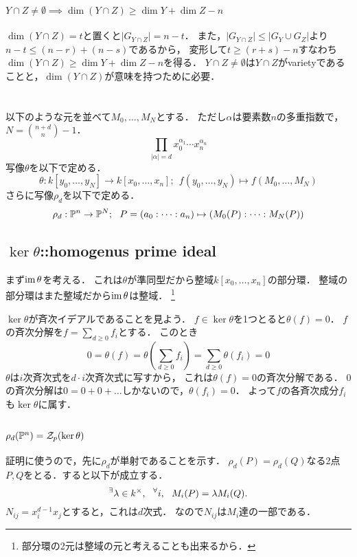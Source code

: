 \documentclass[a4paper]{jarticle}
\begin{document}
    \paragraph{$Y \cap Z \neq \emptyset \implies \dim (Y \cap Z) \geq \dim Y+\dim Z-n$}
    $\dim (Y \cap Z)=t$と置くと$|G_{Y \cap Z}|=n-t$．
    また，$|G_{Y \cap Z}| \leq |G_Y \cup G_Z|$より$n-t \leq (n-r)+(n-s)$であるから，
    変形して$t \geq (r+s)-n$すなわち$\dim (Y \cap Z) \geq \dim Y+\dim Z-n$を得る．
    $Y \cap Z \neq \emptyset$は$Y \cap Z$がvarietyであることと，$\dim (Y \cap Z)$が意味を持つために必要．

\section{} %
    以下のような元を並べて$M_0,\dots,M_N$とする．
    ただし$\alpha$は要素数$n$の多重指数で，$N=\binom{n+d}{n}-1$．
    \[ \prod_{|\alpha|=d}{x_0^{\alpha_1} \cdots x_n^{\alpha_n}} \]
    写像$\theta$を以下で定める．
    \[ \theta:k[y_0,\dots,y_N] \to k[x_0,\dots,x_n];~~ f(y_0,\dots,y_N) \mapsto f(M_0,\dots,M_N) \]
    さらに写像$\rho_d$を以下で定める．
    \[ \rho_d:\mathbb{P}^n \to \mathbb{P}^N;~~ P=(a_0:\dots:a_n) \mapsto (M_0(P):\dots:M_N(P)) \]

    \subsection{$\ker \theta$::homogenus prime ideal}
    まず$\operatorname{im} \theta$を考える．
    これは$\theta$が準同型だから整域$k[x_0,\dots,x_n]$の部分環．
    整域の部分環はまた整域だから$\operatorname{im} \theta$は整域．
    \footnote{部分環の2元は整域の元と考えることも出来るから．}

    $\ker \theta$が斉次イデアルであることを見よう．
    $f \in \ker \theta$を1つとると$\theta(f)=0$．
    $f$の斉次分解を$f=\sum_{d \geq 0}{f_i}$とする．
    このとき
    \[ 0=\theta(f)=\theta \left(\sum_{d \geq 0}{f_i} \right)=\sum_{d \geq 0}{\theta(f_i)}=0 \]
    $\theta$は$i$次斉次式を$d \cdot i$次斉次式に写すから，
    これは$\theta(f)=0$の斉次分解である．
    0の斉次分解は$0=0+0+\dots$しかないので，$\theta(f_i)=0$．
    よって$f$の各斉次成分$f_i$も$\ker \theta$に属す．

    \subsection{$\rho_d(\mathbb{P}^n)=\mathcal{Z}_p(\ker \theta)$}
    証明に使うので，先に$\rho_d$が単射であることを示す．
    $\rho_d(P)=\rho_d(Q)$なる2点$P,Q$をとる．すると以下が成立する．
    \[ {}^{\exists} \lambda \in k^{\times},~~ {}^{\forall} i,~~ M_i(P)=\lambda M_i(Q). \]
    $N_{ij}=x_i^{d-1} x_j$とすると，これは$d$次式．
    なので$N_{ij}$は$M_i$達の一部である．
\end{document}
